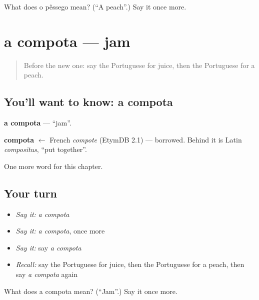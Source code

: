 \begin{tcolorbox}[breakable,colback=teal!4,colframe=teal!35!black,title={Before you move on}]
What does o pêssego mean? (\textquotedblleft{}A peach\textquotedblright{}.) Say it once more.
\end{tcolorbox}
\section[a compota]{a compota — jam}

\label{lesson:PT-C109-compota}



\begin{quote}
Before the new one: say the Portuguese for juice, then the Portuguese for a peach.
\end{quote}

\subsection*{You'll want to know: a compota}
\textbf{a compota} — \textquotedblleft{}jam\textquotedblright{}.

\begin{cousinweb}
\textbf{compota} $\leftarrow$ French \emph{compote} (EtymDB 2.1) — borrowed. Behind it is Latin \emph{compositus}, \textquotedblleft{}put together\textquotedblright{}.
\end{cousinweb}

\begin{grammarlens}[title={What you've built}]
One more word for this chapter.
\end{grammarlens}

\subsection*{Your turn}
\begin{itemize}
\raggedright
  \item \emph{Say it:} \emph{a compota}
  \item \emph{Say it:} \emph{a compota}, once more
  \item \emph{Say it:} say \emph{a compota}
  \item \emph{Recall:} say the Portuguese for juice, then the Portuguese for a peach, then say \emph{a compota} again
\end{itemize}

\begin{tcolorbox}[breakable,colback=teal!4,colframe=teal!35!black,title={Before you move on}]
What does a compota mean? (\textquotedblleft{}Jam\textquotedblright{}.) Say it once more.
\end{tcolorbox}
